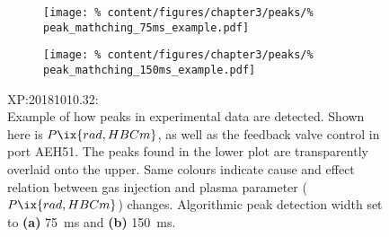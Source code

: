 %
        \begin{figure}[t]%
            \centering%
            \begin{subfigure}{0.49\textwidth}%
                \texttt{[image: \%
                    content/figures/chapter3/peaks/\%
                    peak\_mathching\_75ms\_example.pdf]}%
                \caption{}%
            \end{subfigure}%
            \begin{subfigure}{0.49\textwidth}%
                \texttt{[image: \%
                    content/figures/chapter3/peaks/\%
                    peak\_mathching\_150ms\_example.pdf]}%
                \caption{}%
            \end{subfigure}%
            \caption{%
                XP:20181010.32:\\%
                Example of how peaks in experimental data are detected. Shown here is $P\ix{rad,HBCm}$, as well as the feedback valve control in port AEH51. The peaks found in the lower plot are transparently overlaid onto the upper. Same colours indicate cause and effect relation between gas injection and plasma parameter ($P\ix{rad,HBCm}$) changes.  Algorithmic peak detection width set to \textbf{(a)} \SI{75}{\milli\second} and \textbf{(b)} \SI{150}{\milli\second}.}\label{fig:peak_finding_examples}%
        \end{figure}%
%
